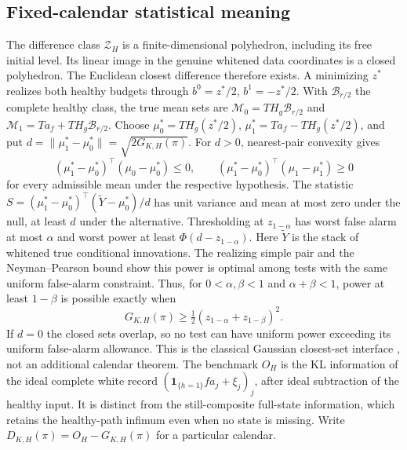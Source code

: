 \documentclass[11pt]{article}
\begin{document}
\subsection{Fixed-calendar statistical meaning}
The difference class $\mathcal Z_H$ is a finite-dimensional polyhedron, including
its free initial level. Its linear image in the genuine whitened data coordinates
is a closed polyhedron. The Euclidean closest difference therefore exists.
A minimizing $z^*$ realizes both healthy budgets through
$b^0=z^*/2$, $b^1=-z^*/2$. With $\mathcal B_{r/2}$ the complete healthy class,
the true mean sets are $\mathcal M_0=T H_g\mathcal B_{r/2}$ and
$\mathcal M_1=T a_f+T H_g\mathcal B_{r/2}$.
Choose $\mu_0^*=T H_g(z^*/2)$, $\mu_1^*=T a_f-T H_g(z^*/2)$, and put
$d=\|\mu_1^*-\mu_0^*\|=\sqrt{2G_{K,H}(\pi)}$.
For $d>0$, nearest-pair convexity gives
\[
(\mu_1^*-\mu_0^*)^\top(\mu_0-\mu_0^*)\le0,\qquad
(\mu_1^*-\mu_0^*)^\top(\mu_1-\mu_1^*)\ge0
\]
for every admissible mean under the respective hypothesis.
The statistic
$S=(\mu_1^*-\mu_0^*)^\top(\widetilde Y-\mu_0^*)/d$
has unit variance and mean at most zero under the null, at least $d$ under
the alternative. Thresholding at $z_{1-\alpha}$ has worst false alarm
at most $\alpha$ and worst power at least
$\Phi(d-z_{1-\alpha})$.
Here $\widetilde Y$ is the stack of whitened true conditional innovations.
The realizing simple pair and the Neyman--Pearson bound show this power is
optimal among tests with the same uniform false-alarm constraint.
Thus, for $0<\alpha,\beta<1$ and $\alpha+\beta<1$, power at least
$1-\beta$ is possible exactly when
\[
G_{K,H}(\pi)\ge\tfrac12(z_{1-\alpha}+z_{1-\beta})^2.
\]
If $d=0$ the closed sets overlap, so no test can have uniform power exceeding
its uniform false-alarm allowance. This is the classical Gaussian closest-set
interface \cite{convex}, not an additional calendar theorem.
The benchmark $O_H$ is the KL information of the ideal complete white record
$(\mathbf1_{\{h=1\}}fa_j+\xi_j)_j$, after ideal subtraction of the healthy input.
It is distinct from the still-composite full-state information, which retains
the healthy-path infimum even when no state is missing.
Write $D_{K,H}(\pi)=O_H-G_{K,H}(\pi)$ for a particular calendar.

\end{document}
